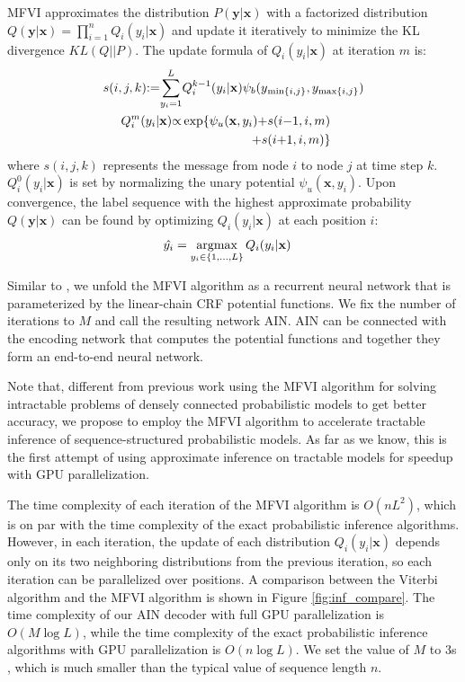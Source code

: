 \documentclass[11pt,a4paper]{article}
\newcommand{\argmax}{\operatornamewithlimits{argmax}}
\newcommand{\xvec}{\mathbf{x}}
\newcommand{\yvec}{\mathbf{y}}
\begin{document}
MFVI approximates the distribution $P(\yvec|\xvec)$ with a factorized distribution $Q(\yvec|\xvec)=\prod\limits_{i=1}^{n} Q_i(y_i|\xvec)$ and update it iteratively to minimize the KL divergence $KL(Q||P)$. The update formula of $Q_i(y_i|\xvec)$ at iteration $m$ is:
\begin{align*}
s(i,j,k){:=}\sum\limits_{\mathclap{y_{i}=1}}^L Q^{k{-}1}_{i}(y_{i}|\xvec)\psi_b(y&_{\min\{i,j\}}, y_{\max\{i,j\}})\\
Q_i^{m}(y_i|\xvec) {\propto} \exp\{\psi_u(\xvec, y_i)+&s(i{-}1,i,m)\nonumber\\
{+}s&(i{+}1,i,m)\} \nonumber
\end{align*}
where $s(i,j,k)$ represents the message from node $i$ to node $j$ at time step $k$. $Q_i^{0}(y_i|\xvec)$ is set by normalizing the unary potential $\psi_u(\xvec, y_i)$. Upon convergence, the label sequence with the highest approximate probability $Q(\yvec|\xvec)$ can be found by optimizing $Q_i (y_i|\xvec)$ at each position $i$:
\begin{align}
\hat{y_i} &= \argmax \limits_{y_i \in \{1,\dots,L\}} Q_i(y_i|\xvec) \nonumber
\end{align}



Similar to \citet{zheng2015conditional}, we unfold the MFVI algorithm as a recurrent neural network that is parameterized by the linear-chain CRF potential functions. We fix the number of iterations to $M$ and call the resulting network AIN. AIN can be connected with the encoding network that computes the potential functions and together they form an end-to-end neural network. 

Note that, different from previous work \cite{NIPS2011_4296,zheng2015conditional,baque2016principled,7913730,wang-etal-2019-second} using the MFVI algorithm for solving intractable problems of densely connected probabilistic models to get better accuracy, we propose to employ the MFVI algorithm to accelerate tractable inference of sequence-structured probabilistic models. As far as we know, this is the first attempt of using approximate inference on tractable models for speedup with GPU parallelization.

The time complexity of each iteration of the MFVI algorithm is $O(nL^2)$, which is on par with the time complexity of the exact probabilistic inference algorithms. However, in each iteration, the update of each distribution $Q_i(y_i|\xvec)$ depends only on its two neighboring distributions from the previous iteration, so each iteration can be parallelized over positions. A comparison between the Viterbi algorithm and the MFVI algorithm is shown in Figure \ref{fig:inf_compare}. The time complexity of our AIN decoder with full GPU parallelization is $O(M \log L)$, while the time complexity of the exact probabilistic inference algorithms with GPU parallelization is $O(n \log L)$. We set the value of $M$ to $3$s , which is much smaller than the typical value of sequence length $n$.
\end{document}
